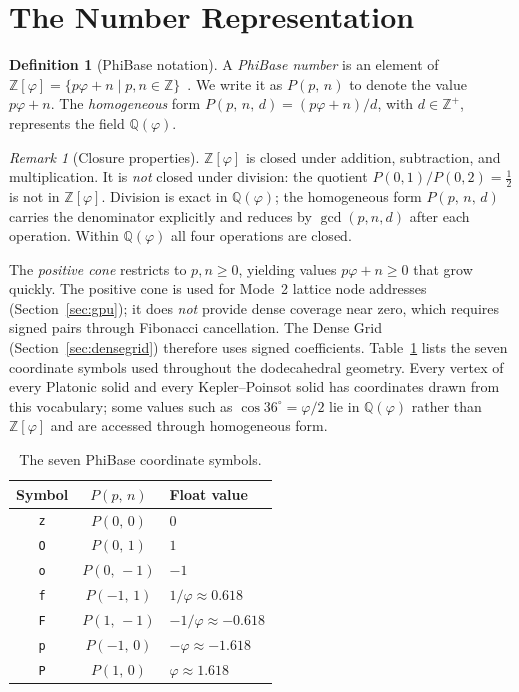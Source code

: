\documentclass[12pt]{article}
\theoremstyle{definition}
\newtheorem{definition}[theorem]{Definition}
\theoremstyle{remark}
\newtheorem{remark}[theorem]{Remark}
\newcommand{\Z}{\mathbb{Z}}
\newcommand{\Zphi}{\mathbb{Z}[\varphi]}
\newcommand{\Qphi}{\mathbb{Q}(\varphi)}
\newcommand{\Phib}[2]{P(#1,\,#2)}
\newcommand{\Phibd}[3]{P(#1,\,#2,\,#3)}
\begin{document}
\section{The Number Representation}
\begin{definition}[PhiBase notation]
A \emph{PhiBase number} is an element of
$\Zphi = \{p\varphi + n \mid p,n\in\Z\}$~\cite{marcus}.
We write it as $\Phib{p}{n}$ to denote the value $p\varphi + n$.
The \emph{homogeneous} form $\Phibd{p}{n}{d} = (p\varphi+n)/d$,
with $d\in\Z^+$, represents the field $\Qphi$.
\end{definition}
\begin{remark}[Closure properties]
\label{rem:closure}
$\Zphi$ is closed under addition, subtraction, and multiplication.
It is \emph{not} closed under division: the quotient $P(0,1)/P(0,2)=\tfrac12$
is not in $\Zphi$.  Division is exact in $\Qphi$; the homogeneous
form $\Phibd{p}{n}{d}$ carries the denominator explicitly and reduces
by $\gcd(p,n,d)$ after each operation.  Within $\Qphi$ all four
operations are closed.
\end{remark}
The \emph{positive cone} restricts to $p,n\geq 0$, yielding values
$p\varphi+n\geq 0$ that grow quickly.  The positive cone is used for
Mode~2 lattice node addresses (Section~\ref{sec:gpu}); it does
\emph{not} provide dense coverage near zero, which requires signed
pairs through Fibonacci cancellation.  The Dense Grid
(Section~\ref{sec:densegrid}) therefore uses signed coefficients.
Table~\ref{tab:decode} lists the seven coordinate symbols used
throughout the dodecahedral geometry.  Every vertex of every Platonic
solid and every Kepler--Poinsot solid has coordinates drawn from this
vocabulary; some values such as $\cos 36^\circ = \varphi/2$ lie in
$\Qphi$ rather than $\Zphi$ and are accessed through homogeneous form.
\begin{table}[h]
\centering
\caption{The seven PhiBase coordinate symbols.}
\label{tab:decode}
\begin{tabular}{ccl}
\toprule
Symbol & $\Phib{p}{n}$ & Float value \\
\midrule
\texttt{z} & $\Phib{0}{0}$  & $0$ \\
\texttt{O} & $\Phib{0}{1}$  & $1$ \\
\texttt{o} & $\Phib{0}{-1}$ & $-1$ \\
\texttt{f} & $\Phib{-1}{1}$ & $1/\varphi \approx 0.618$ \\
\texttt{F} & $\Phib{1}{-1}$ & $-1/\varphi \approx -0.618$ \\
\texttt{p} & $\Phib{-1}{0}$ & $-\varphi \approx -1.618$ \\
\texttt{P} & $\Phib{1}{0}$  & $\varphi \approx 1.618$ \\
\bottomrule
\end{tabular}
\end{table}
\end{document}
